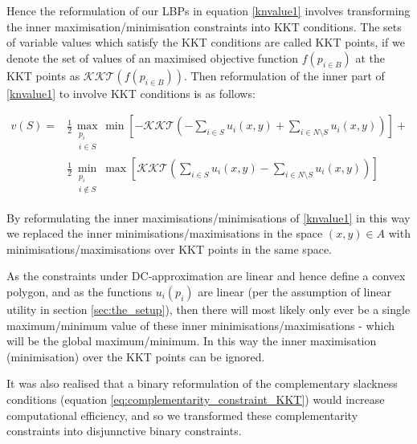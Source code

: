 Hence the reformulation of our LBPs in equation \ref{knvalue1} involves transforming the inner maximisation/minimisation constraints into KKT conditions.
The sets of variable values which satisfy the KKT conditions are called KKT points, if we denote the set of values of an maximised objective function $f(p_{i\in B})$ at the KKT points as $\mathcal{KKT}(f(p_{i\in B}))$.
Then reformulation of the inner part of \eqref{knvalue1} to involve KKT conditions is as follows:




\begin{equation}
\label{kkt_optimization1}
\begin{aligned}
v(S) =& 
 \frac{1}{2}\max_{\substack{p_i \\ i\in S}}   \min\left[-\mathcal{KKT}\left(-\sum_{i\in S} u_i(x,y) + \sum_{i\in N\setminus S}u_i(x,y)\right)\right] +\\
&\frac{1}{2}\min_{\substack{p_i \\ i\notin S}}\max\left[\mathcal{KKT}\left(\sum_{i\in S} u_i(x,y) - \sum_{i\in N\setminus S}u_i(x,y)\right)\right]
\end{aligned}
\end{equation}


By reformulating the inner maximisations/minimisations of \eqref{knvalue1} in this way we replaced the inner minimisations/maximisations in the space $(x,y)\in A$ with minimisations/maximisations over KKT points in the same space.%

As the constraints under DC-approximation are linear and hence define a convex polygon,
and as the functions $u_i(p_i)$ are linear (per the assumption of linear utility in section \ref{sec:the_setup}), then there will most likely only ever be a single maximum/minimum value of these inner minimisations/maximisations - which will be the global maximum/minimum.
In this way the inner maximisation (minimisation) over the KKT points can be ignored.

It was also realised that a binary reformulation of the complementary slackness conditions (equation \ref{eq:complementarity_constraint_KKT}) would increase computational efficiency, and so we transformed these complementarity constraints into disjunnctive binary constraints.

